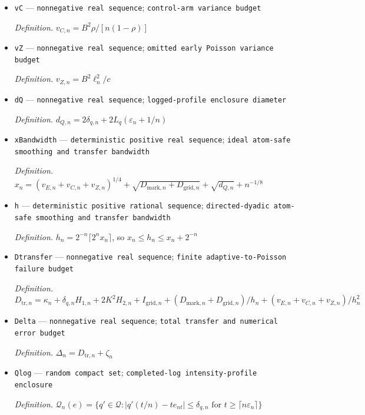\documentclass{article}
\begin{document}
\begin{itemize}
  \item \texttt{vC} --- \texttt{nonnegative real sequence}; \texttt{control-\allowbreak{}arm variance budget}
  \par\smallskip\noindent\emph{Definition.} \(v_{C,n}=B^2\rho/[n(1-\rho)]\)
  \item \texttt{vZ} --- \texttt{nonnegative real sequence}; \texttt{omitted early Poisson variance budget}
  \par\smallskip\noindent\emph{Definition.} \(v_{Z,n}=B^2\ell_n^2/c\)
  \item \texttt{dQ} --- \texttt{nonnegative real sequence}; \texttt{logged-\allowbreak{}profile enclosure diameter}
  \par\smallskip\noindent\emph{Definition.} \(d_{Q,n}=2\delta_{q,n}+2L_q(\varepsilon_n+1/n)\)
  \item \texttt{xBandwidth} --- \texttt{deterministic positive real sequence}; \texttt{ideal atom-\allowbreak{}safe smoothing and transfer bandwidth}
  \par\smallskip\noindent\emph{Definition.} \(x_n=(v_{E,n}+v_{C,n}+v_{Z,n})^{1/4}+\sqrt{D_{\mathrm{mark},n}+D_{\mathrm{grid},n}}+\sqrt{d_{Q,n}}+n^{-1/8}\)
  \item \texttt{h} --- \texttt{deterministic positive rational sequence}; \texttt{directed-\allowbreak{}dyadic atom-\allowbreak{}safe smoothing and transfer bandwidth}
  \par\smallskip\noindent\emph{Definition.} \(h_n=2^{-n}\lceil 2^n x_n\rceil\), so \(x_n\le h_n\le x_n+2^{-n}\)
  \item \texttt{Dtransfer} --- \texttt{nonnegative real sequence}; \texttt{finite adaptive-\allowbreak{}to-\allowbreak{}Poisson failure budget}
  \par\smallskip\noindent\emph{Definition.} \(D_{\mathrm{tr},n}=\kappa_n+\delta_{q,n}H_{1,n}+2K^2H_{2,n}+I_{\mathrm{grid},n}+(D_{\mathrm{mark},n}+D_{\mathrm{grid},n})/h_n+(v_{E,n}+v_{C,n}+v_{Z,n})/h_n^2\)
  \item \texttt{Delta} --- \texttt{nonnegative real sequence}; \texttt{total transfer and numerical error budget}
  \par\smallskip\noindent\emph{Definition.} \(\Delta_n=D_{\mathrm{tr},n}+\zeta_n\)
  \item \texttt{Qlog} --- \texttt{random compact set}; \texttt{completed-\allowbreak{}log intensity-\allowbreak{}profile enclosure}
  \par\smallskip\noindent\emph{Definition.} \(\mathcal Q_n(e)=\{q'\in\mathcal Q:|q'(t/n)-t e_{nt}|\le\delta_{q,n}\text{ for }t\ge\lceil n\varepsilon_n\rceil\}\)

\end{itemize}
\end{document}
